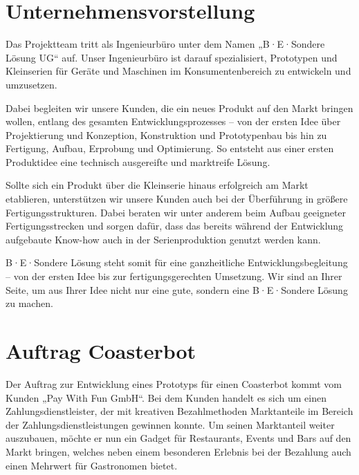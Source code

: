\documentclass[
  a4paper,
  12pt,
  DIV=12,        %
  parskip=half,  %
  headings=small %
]{scrartcl}
\theoremstyle{definition}
\theoremstyle{definition}
\begin{document}
\newpage

\tableofcontents

\newpage

\section{Unternehmensvorstellung}\label{unternehmensvorstellung}

Das Projektteam tritt als Ingenieurbüro unter dem Namen „B·E·Sondere
Lösung UG`` auf. Unser Ingenieurbüro ist darauf spezialisiert,
Prototypen und Kleinserien für Geräte und Maschinen im
Konsumentenbereich zu entwickeln und umzusetzen.

Dabei begleiten wir unsere Kunden, die ein neues Produkt auf den Markt bringen wollen, entlang des gesamten
Entwicklungsprozesses -- von der ersten Idee über Projektierung und
Konzeption, Konstruktion und Prototypenbau bis hin zu Fertigung, Aufbau,
Erprobung und Optimierung. So entsteht aus einer ersten Produktidee eine
technisch ausgereifte und marktreife Lösung.

Sollte sich ein Produkt über die Kleinserie hinaus erfolgreich am Markt
etablieren, unterstützen wir unsere Kunden auch bei der Überführung in
größere Fertigungsstrukturen. Dabei beraten wir unter anderem beim
Aufbau geeigneter Fertigungsstrecken und sorgen dafür, dass das bereits
während der Entwicklung aufgebaute Know-how auch in der Serienproduktion
genutzt werden kann.

B·E·Sondere Lösung steht somit für eine ganzheitliche
Entwicklungsbegleitung -- von der ersten Idee bis zur
fertigungsgerechten Umsetzung. Wir sind an Ihrer Seite, um aus Ihrer
Idee nicht nur eine gute, sondern eine B·E·Sondere Lösung zu machen.

\section{Auftrag Coasterbot}\label{auftrag-coasterbot}

Der Auftrag zur Entwicklung eines Prototyps für einen Coasterbot kommt
vom Kunden „Pay With Fun GmbH``. Bei dem Kunden handelt es sich um einen
Zahlungsdienstleister, der mit kreativen Bezahlmethoden Marktanteile im
Bereich der Zahlungsdienstleistungen gewinnen konnte. Um seinen
Marktanteil weiter auszubauen, möchte er nun ein Gadget für Restaurants,
Events und Bars auf den Markt bringen, welches neben einem besonderen
Erlebnis bei der Bezahlung auch einen Mehrwert für Gastronomen bietet.
\end{document}

